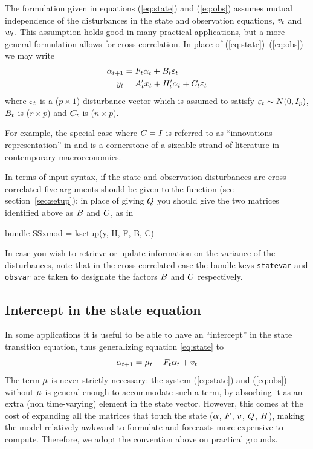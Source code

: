 \documentclass[a4paper]{article}
\begin{document}
The formulation given in equations (\ref{eq:state}) and (\ref{eq:obs})
assumes mutual independence of the disturbances in the state and
observation equations, $v_t$ and $w_t$.  This assumption
holds good in many practical applications, but a more general
formulation allows for cross-correlation.  In place of
(\ref{eq:state})--(\ref{eq:obs}) we may write
%
\begin{align*}
  \alpha_{t+1} &= F_t \alpha_t + 
     B_t \varepsilon_t \\
  y_t &= A_t'x_t + H_t' \alpha_t + 
     C_t \varepsilon_t 
\end{align*}
%
where $\varepsilon_t$ is a ($p \times 1$) disturbance vector which is
assumed to satisfy $\varepsilon_t \sim N(0, I_p)$, $B_t$ is
($r \times p$) and $C_t$ is ($n \times p$).

For example, the special case where $C = I$ is referred to as
``innovations representation'' in \cite{hansen-sargent2013} and is a
cornerstone of a sizeable strand of literature in contemporary
macroeconomics.

In terms of input syntax, if the state and observation disturbances
are cross-correlated five arguments should be given to the
 function (see section~\ref{sec:setup}): in place of
giving $Q$ you should give the two matrices identified above as
$B$ and $C$, as in
\begin{code}
bundle SSxmod = ksetup(y, H, F, B, C)
\end{code}

In case you wish to retrieve or update information on the variance of
the disturbances, note that in the cross-correlated case the bundle
keys \texttt{statevar} and \texttt{obsvar} are taken to designate the
factors $B$ and $C$ respectively.

\subsection{Intercept in the state equation}
\label{sec:stconst}

In some applications it is useful to be able to have an ``intercept''
in the state transition equation, thus generalizing equation
\eqref{eq:state} to
\[
  \alpha_{t+1} = \mu_t + F_t \alpha_t + v_t \\
\]
The term $\mu$ is never strictly necessary: the system
(\ref{eq:state}) and (\ref{eq:obs}) without $\mu$ is general
enough to accommodate such a term, by absorbing it as an extra (non
time-varying) element in the state vector.  However, this comes at the
cost of expanding all the matrices that touch the state ($\alpha$,
$F$, $v$, $Q$, $H$), making the model
relatively awkward to formulate and forecasts more expensive to
compute. Therefore, we adopt the convention above on practical
grounds.
\end{document}
